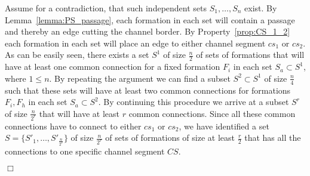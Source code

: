 \documentclass[a4paper,10pt]{llncs}
\newcounter{prop}
\renewenvironment{proof}
{{\bf Proof:}}{\hspace*{\fill}$\Box$\par\vspace{2mm}}
\begin{document}
\begin{proof}
Assume for a contradiction, that such independent sets $S_1,\ldots, S_n$ exist.
By Lemma~\ref{lemma:PS_passage}, each formation in each set will contain a passage and thereby an edge cutting the channel border.
By Property~\ref{prop:CS_1_2} each formation in each set will place an edge to either channel segment $cs_1$ or $cs_2$. As can be easily seen, there exists a set $S^1$ of size $\frac{n}{2}$ of sets of formations that will have at least one common connection for a fixed formation $F_i$ in each set $S_a \subset S^1$, where $1\leq n$.
By repeating the argument we can find a subset $S^2\subset S^1$ of size $\frac{n}{4}$ such that these sets will have at least two common connections for formations $F_i,F_h$ in each set $S_a \subset S^2$. By continuing this procedure we arrive at a subset $S^r$ of size $\frac{n}{2^r}$ that will have at least $r$ common connections. Since all these common connections have to connect to either $cs_1$ or $cs_2$, we have identified a set $S=\{ S'_1, \ldots , S'_{\frac{n}{2^r}}\}$ of size $\frac{n}{2^r}$ of sets of formations of size at least $\frac{r}{2}$ that has all the connections to one specific channel segment $CS$.


\end{proof}
\end{document}
